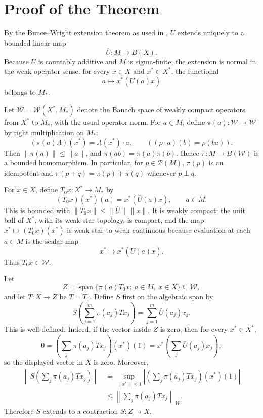 \documentclass[11pt]{article}
\newcommand{\cP}{\mathcal P}
\newcommand{\cW}{\mathcal W}
\begin{document}
\section*{Proof of the Theorem}

By the Bunce--Wright extension theorem as used in \cite{HHLiu}, \(U\) extends
uniquely to a bounded linear map
\[
        \overline U:M\longrightarrow B(X).
\]
Because \(U\) is countably additive and \(M\) is sigma-finite, the extension is
normal in the weak-operator sense: for every \(x\in X\) and \(x^*\in X^*\), the
functional
\[
        a\longmapsto x^*(\overline U(a)x)
\]
belongs to \(M_*\).

Let \(\cW=\cW(X^*,M_*)\) denote the Banach space of weakly compact operators from
\(X^*\) to \(M_*\), with the usual operator norm.  For \(a\in M\), define
\(\pi(a):\cW\to\cW\) by right multiplication on \(M_*\):
\[
        (\pi(a)A)(x^*)=A(x^*)\cdot a,\qquad
        ((\rho\cdot a)(b)=\rho(ba)).
\]
Then \(\|\pi(a)\|\leq\|a\|\), and \(\pi(ab)=\pi(a)\pi(b)\).  Hence
\(\pi:M\to B(\cW)\) is a bounded homomorphism.  In particular, for
\(p\in\cP(M)\), \(\pi(p)\) is an idempotent and
\(\pi(p+q)=\pi(p)+\pi(q)\) whenever \(p\perp q\).

For \(x\in X\), define \(T_0x:X^*\to M_*\) by
\[
        (T_0x)(x^*)(a)=x^*(\overline U(a)x),\qquad a\in M.
\]
This is bounded with \(\|T_0x\|\leq\|\overline U\|\,\|x\|\).  It is weakly
compact: the unit ball of \(X^*\), with its weak-star topology, is compact, and
the map \(x^*\mapsto (T_0x)(x^*)\) is weak-star to weak continuous because
evaluation at each \(a\in M\) is the scalar map
\[
        x^*\longmapsto x^*(\overline U(a)x).
\]
Thus \(T_0x\in\cW\).

Let
\[
        Z=\overline{\operatorname{span}}\{\pi(a)T_0x:\ a\in M,\ x\in X\}
        \subseteq \cW,
\]
and let \(T:X\to Z\) be \(T=T_0\).  Define \(S\) first on the algebraic span by
\[
        S\left(\sum_{j=1}^m \pi(a_j)T x_j\right)
        =\sum_{j=1}^m \overline U(a_j)x_j .
\]
This is well-defined.  Indeed, if the vector inside \(Z\) is zero, then for every
\(x^*\in X^*\),
\[
        0=\left(\sum_j \pi(a_j)T x_j\right)(x^*)(1)
        =x^*\left(\sum_j \overline U(a_j)x_j\right),
\]
so the displayed vector in \(X\) is zero.  Moreover,
\[
\begin{aligned}
\left\|S\left(\sum_j \pi(a_j)T x_j\right)\right\|
&=\sup_{\|x^*\|\leq1}
 \left|\left(\sum_j \pi(a_j)T x_j\right)(x^*)(1)\right|  \\
&\leq
\left\|\sum_j \pi(a_j)T x_j\right\|_{\cW}.
\end{aligned}
\]
Therefore \(S\) extends to a contraction \(S:Z\to X\).
\end{document}
